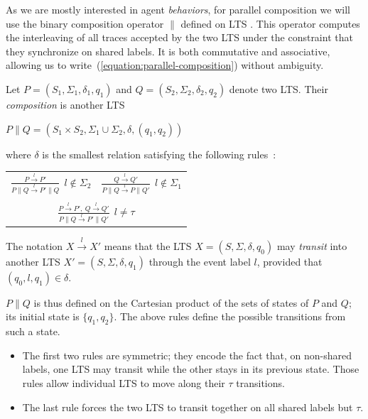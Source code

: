 As we are mostly interested in agent \emph{behaviors}, for parallel composition we will use the binary composition operator $\parallel$ defined on LTS \cite{Giannakopoulou:1999, Magee:1999}. This operator computes the interleaving of all traces accepted by the two LTS under the constraint that they synchronize on shared labels. It is both commutative and associative, allowing us to write~(\ref{equation:parallel-composition}) without ambiguity. 

\begin{definition}
Let $P = (S_1,\Sigma_1,\delta_1,q_{1})$ and $Q = (S_2,\Sigma_2,\delta_2,q_{2})$ denote two LTS. Their \emph{composition} is another LTS 
\begin{center}
$P \parallel Q = (S_1 \times S_2,\Sigma_1\cup\Sigma_2,\delta,(q_1,q_2))$
\end{center}
\noindent where $\delta$ is the smallest relation satisfying the following rules~\cite{Giannakopoulou:1999}:

\begin{center}
\begin{tabular}{cc}
$\frac{\displaystyle P \stackrel{l}{\longrightarrow} P'}{\displaystyle P \parallel Q \stackrel{l}{\longrightarrow} P' \parallel Q}~~l \notin \Sigma_2$ &
$\frac{\displaystyle Q \stackrel{l}{\longrightarrow} Q'}{\displaystyle P \parallel Q \stackrel{l}{\longrightarrow} P \parallel Q'}~~l \notin \Sigma_1$ \\
 & \\
\multicolumn{2}{c}{$\frac{\displaystyle P \stackrel{l}{\longrightarrow} P',~Q \stackrel{l}{\longrightarrow} Q'}{\displaystyle P \parallel Q \stackrel{l}{\longrightarrow} P' \parallel Q'}~~l \neq \tau$} \\
\end{tabular}
\end{center}
The notation $X \stackrel{l}{\longrightarrow} X'$ means that the LTS $X = (S,\Sigma,\delta,q_0)$ may \emph{transit} into another LTS $X' = (S,\Sigma,\delta,q_1)$ through the event label $l$, provided that $(q_0,l,q_1) \in \delta$. 
\end{definition}

$P \parallel Q$ is thus defined on the Cartesian product of the sets of states of $P$ and $Q$; its initial state is $\{q_1,q_2\}$. The above rules define the possible transitions from such a state. 

\begin{itemize}
\item The first two rules are symmetric; they encode the fact that, on non-shared labels, one LTS may transit while the other stays in its previous state. Those rules allow individual LTS to move along their $\tau$ transitions. 
\item The last rule forces the two LTS to transit together on all shared labels but $\tau$.
\end{itemize}

